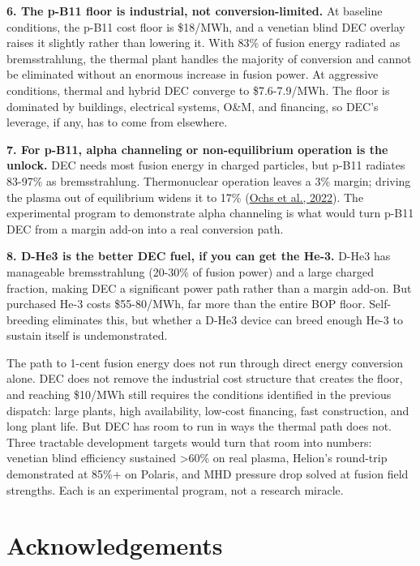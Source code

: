 \documentclass{article}
\begin{document}
\textbf{6. The p-B11 floor is industrial, not conversion-limited.} At
baseline conditions, the p-B11 cost floor is \$18/MWh, and a venetian
blind DEC overlay raises it slightly rather than lowering it. With 83\% of fusion energy
radiated as bremsstrahlung, the thermal plant handles the majority of
conversion and cannot be eliminated without an enormous increase in
fusion power. At aggressive conditions, thermal and hybrid DEC converge
to \$7.6-7.9/MWh. The floor is dominated by buildings, electrical
systems, O\&M, and financing, so DEC's leverage, if any, has to come
from elsewhere.

\textbf{7. For p-B11, alpha channeling or non-equilibrium operation is
the unlock.} DEC needs most fusion energy in charged particles, but
p-B11 radiates 83-97\% as bremsstrahlung. Thermonuclear operation leaves
a 3\% margin; driving the plasma out of equilibrium widens it to 17\%
(\href{https://doi.org/10.1103/PhysRevE.106.055215}{Ochs et al., 2022}).
The experimental program to demonstrate alpha channeling is what would
turn p-B11 DEC from a margin add-on into a real conversion path.

\textbf{8. D-He3 is the better DEC fuel, if you can get the He-3.} D-He3
has manageable bremsstrahlung (20-30\% of fusion power) and a large
charged fraction, making DEC a significant power path rather than a
margin add-on. But purchased He-3 costs \$55-80/MWh, far more than the
entire BOP floor. Self-breeding eliminates this, but whether a D-He3
device can breed enough He-3 to sustain itself is undemonstrated.

The path to 1-cent fusion energy does not run through direct energy
conversion alone. DEC does not remove the industrial cost structure that
creates the floor, and reaching \$10/MWh still requires the conditions
identified in the previous dispatch: large plants, high availability,
low-cost financing, fast construction, and long plant life. But DEC has
room to run in ways the thermal path does not. Three tractable
development targets would turn that room into numbers: venetian blind
efficiency sustained \textgreater60\% on real plasma, Helion's
round-trip demonstrated at 85\%+ on Polaris, and MHD pressure drop
solved at fusion field strengths. Each is an experimental program, not a
research miracle.

\section{Acknowledgements}\label{acknowledgements}
\end{document}
